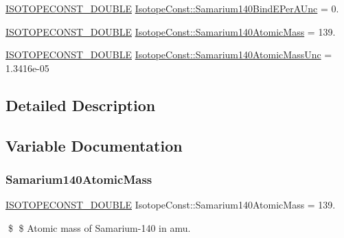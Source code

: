 \begin{DoxyCompactItemize}
\mbox{\hyperlink{group___isotope_const-_macros_ga8f45a7272ce02c0b4c65c44636ed719a}{I\+S\+O\+T\+O\+P\+E\+C\+O\+N\+S\+T\+\_\+\+D\+O\+U\+B\+LE}} \mbox{\hyperlink{group___isotope_const-_samarium-_sm140_ga7d6d99ddb5581014dde6da96c97961b9}{Isotope\+Const\+::\+Samarium140\+Bind\+E\+Per\+A\+Unc}} = 0.
\item 
\mbox{\hyperlink{group___isotope_const-_macros_ga8f45a7272ce02c0b4c65c44636ed719a}{I\+S\+O\+T\+O\+P\+E\+C\+O\+N\+S\+T\+\_\+\+D\+O\+U\+B\+LE}} \mbox{\hyperlink{group___isotope_const-_samarium-_sm140_ga0686944b04bf240fd5c851a04084d6c3}{Isotope\+Const\+::\+Samarium140\+Atomic\+Mass}} = 139.
\item 
\mbox{\hyperlink{group___isotope_const-_macros_ga8f45a7272ce02c0b4c65c44636ed719a}{I\+S\+O\+T\+O\+P\+E\+C\+O\+N\+S\+T\+\_\+\+D\+O\+U\+B\+LE}} \mbox{\hyperlink{group___isotope_const-_samarium-_sm140_gada6eb59c9eafc543703c60e9240c9b1d}{Isotope\+Const\+::\+Samarium140\+Atomic\+Mass\+Unc}} = 1.\+3416e-\/05
\end{DoxyCompactItemize}


\subsection{Detailed Description}


\subsection{Variable Documentation}
\mbox{\label{group___isotope_const-_samarium-_sm140_ga0686944b04bf240fd5c851a04084d6c3}} 
\subsubsection{\texorpdfstring{Samarium140\+Atomic\+Mass}{Samarium140AtomicMass}}
{\footnotesize\ttfamily \mbox{\hyperlink{group___isotope_const-_macros_ga8f45a7272ce02c0b4c65c44636ed719a}{I\+S\+O\+T\+O\+P\+E\+C\+O\+N\+S\+T\+\_\+\+D\+O\+U\+B\+LE}} Isotope\+Const\+::\+Samarium140\+Atomic\+Mass = 139.}

\$ \$ Atomic mass of Samarium-\/140 in amu. \mbox{\label{group___isotope_const-_samarium-_sm140_gada6eb59c9eafc543703c60e9240c9b1d}} 

